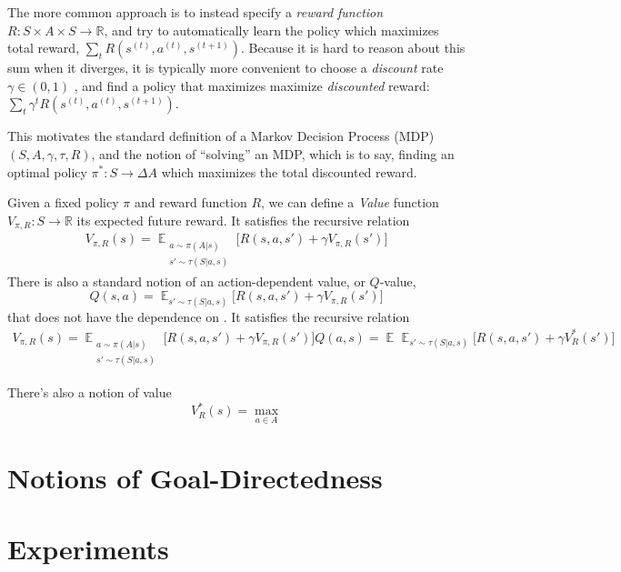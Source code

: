 \documentclass{article}
\DeclareMathOperator*{\argmax}{\arg\max}
\DeclareMathOperator*{\Ex}{\mathbb E}
\begin{document}
    The more common approach is to instead specify a \emph{reward function} $R : S \times A \times S \to \mathbb R$, and try to automatically learn the policy which maximizes total reward, $\sum_{t} R(s^{(t)}, a^{(t)}, s^{(t+1)})$.
    Because it is hard to reason about this sum when it diverges, it is typically more convenient to choose a \emph{discount} rate $\gamma \in (0,1)$ , and find a policy that maximizes maximize \emph{discounted} reward:
    $
        \sum_{t} \gamma^t R(s^{(t)}, a^{(t)}, s^{(t+1)})
    $.

    This motivates the standard definition of a Markov Decision Process (MDP) $(S, A, \gamma, \tau, R)$, and the notion of ``solving'' an MDP, which is to say, finding an optimal policy $\pi^* : S \to \Delta A$ which maximizes the total discounted reward.

    Given a fixed policy $\pi$ and reward function $R$, we can define a \emph{Value} function $V_{\pi, R} : S \to \mathbb R$ its expected future reward.
    It satisfies the recursive relation
    \begin{align*}
        V_{\pi,R}(s) = \Ex_{ \substack{ a \sim \pi(A|s) \\ s' \sim \tau(S|a,s) }}
            \Big[ R(s,a,s') + \gamma V_{\pi, R}(s') \Big]
    \end{align*}
    There is also a standard notion of an action-dependent value, or $Q$-value,
    \[
        Q(s,a) = \Ex_{ s' \sim \tau(S|a,s) } \Big[ R(s,a,s') + \gamma V_{\pi, R}(s') \Big]
    \]
    that does not have the dependence on .
    It satisfies the recursive relation
    \begin{align*}
        V_{\pi,R}(s) = \Ex_{ \substack{ a \sim \pi(A|s) \\ s' \sim \tau(S|a,s) }}
            \Big[ R(s,a,s') + \gamma V_{\pi, R}(s') \Big]
        Q(a,s) = \Ex_{} \Ex_{s' \sim \tau(S|a,s)} \Big[ R(s,a,s') + \gamma V^*_R(s') \Big]
    \end{align*}

    There's also a notion of value
    \[
        V^*_R(s)  = \max_{a \in A}
    \]




    \section{Notions of Goal-Directedness}



    \section{Experiments}
\end{document}
